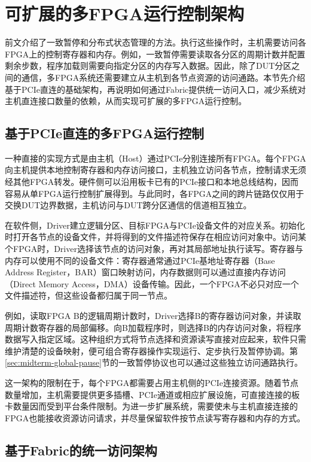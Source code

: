 \section{可扩展的多FPGA运行控制架构}
\label{sec:midterm-fabric}

前文介绍了一致暂停和分布式状态管理的方法。执行这些操作时，主机需要访问各FPGA上的控制寄存器和内存。例如，一致暂停需要读取各分区的周期计数并配置剩余步数，程序加载则需要向指定分区的内存写入数据。因此，除了DUT分区之间的通信，多FPGA系统还需要建立从主机到各节点资源的访问通路。本节先介绍基于PCIe直连的基础架构，再说明如何通过Fabric提供统一访问入口，减少系统对主机直连接口数量的依赖，从而实现可扩展的多FPGA运行控制。

\subsection{基于PCIe直连的多FPGA运行控制}
\label{sec:midterm-direct-host}

一种直接的实现方式是由主机（Host）通过PCIe分别连接所有FPGA。每个FPGA向主机提供本地控制寄存器和内存访问接口，主机独立访问各节点，控制请求无须经其他FPGA转发。硬件侧可以沿用板卡已有的PCIe接口和本地总线结构，因而容易从单FPGA运行控制扩展得到。与此同时，各FPGA之间的跨片链路仅仅用于交换DUT边界数据，主机访问与DUT跨分区通信的信道相互独立。

在软件侧，Driver建立逻辑分区、目标FPGA与PCIe设备文件的对应关系。初始化时打开各节点的设备文件，并将得到的文件描述符保存在相应访问对象中。访问某个FPGA时，Driver选择该节点的访问对象，再对其局部地址执行读写。寄存器与内存可以使用不同的设备文件：寄存器通常通过PCIe基地址寄存器（Base Address Register，BAR）窗口映射访问，内存数据则可以通过直接内存访问（Direct Memory Access，DMA）设备传输。因此，一个FPGA不必只对应一个文件描述符，但这些设备都归属于同一节点。

例如，读取FPGA B的逻辑周期计数时，Driver选择B的寄存器访问对象，并读取周期计数寄存器的局部偏移。向B加载程序时，则选择B的内存访问对象，将程序数据写入指定区域。这种组织方式将节点选择和资源读写直接对应起来，软件只需维护清楚的设备映射，便可组合寄存器操作实现运行、定步执行及暂停协调。第\ref{sec:midterm-global-pause}节的一致暂停协议也可以通过这些独立访问通路执行。

这一架构的限制在于，每个FPGA都需要占用主机侧的PCIe连接资源。随着节点数量增加，主机需要提供更多插槽、PCIe通道或相应扩展设施，可直接连接的板卡数量因而受到平台条件限制。为进一步扩展系统，需要使未与主机直接连接的FPGA也能接收资源访问请求，并尽量保留软件按节点读写寄存器和内存的方式。

\subsection{基于Fabric的统一访问架构}
\label{sec:midterm-fabric-architecture}

